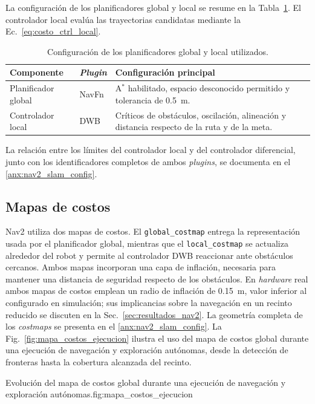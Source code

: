 La configuración de los planificadores global y local se resume en la
Tabla~\ref{tab:nav2_componentes_ch9}. El controlador local evalúa las
trayectorias candidatas mediante la Ec.~\eqref{eq:costo_ctrl_local}.

\begin{table}[htbp]
\centering
\caption{Configuración de los planificadores global y local utilizados.}
\label{tab:nav2_componentes_ch9}
\small
\begin{tabular}{p{3.2cm} p{1.8cm} p{8.6cm}}
\toprule
\textbf{Componente} & \textbf{\textit{Plugin}} & \textbf{Configuración principal} \\
\midrule
Planificador global & NavFn & A$^*$ habilitado, espacio desconocido permitido y tolerancia de 0.5~m. \\
Controlador local & DWB & Críticos de obstáculos, oscilación, alineación y distancia respecto de la ruta y de la meta. \\
\bottomrule
\end{tabular}
\end{table}

La relación entre los límites del controlador local y del controlador
diferencial, junto con los identificadores completos de ambos
\textit{plugins}, se documenta en el \ref{anx:nav2_slam_config}.

\subsection{Mapas de costos}
\label{sec:costmaps_ch9}

Nav2 utiliza dos mapas de costos. El \texttt{global\_costmap} entrega la representación usada por el planificador global, mientras que el \texttt{local\_costmap} se actualiza alrededor del robot y permite al controlador DWB reaccionar ante obstáculos cercanos. Ambos mapas incorporan una capa de inflación, necesaria para mantener una distancia de seguridad respecto de los obstáculos.
En \textit{hardware} real ambos mapas de costos emplean un radio de inflación de 0.15~m, valor inferior al configurado en simulación; sus implicancias sobre la navegación en un recinto reducido se discuten en la Sec.~\ref{sec:resultados_nav2}. La geometría completa de los \textit{costmaps} se presenta en el \ref{anx:nav2_slam_config}.
La Fig.~\ref{fig:mapa_costos_ejecucion} ilustra el uso del mapa de costos
global durante una ejecución de navegación y exploración autónomas, desde la
detección de fronteras hasta la cobertura alcanzada del recinto.

\begin{utemMultiFigurePropia}{Evolución del mapa de costos global durante una ejecución de navegación y exploración autónomas.}{fig:mapa_costos_ejecucion}
\hfill
{}
\hfill
{}
\end{utemMultiFigurePropia}

